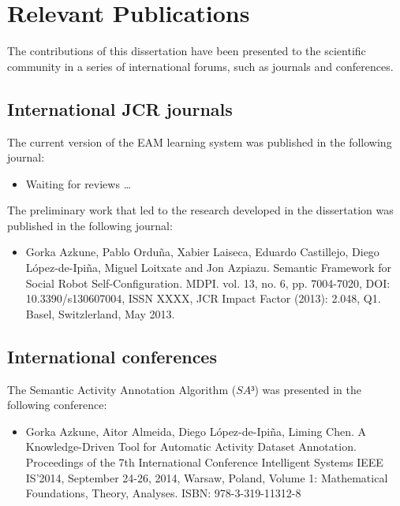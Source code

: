 \section{Relevant Publications}
\label{sec:conclusions:pub}

The contributions of this dissertation have been presented to the scientific community in a series of international forums, such as journals and conferences.

\subsection{International JCR journals}

The current version of the EAM learning system was published in the following journal:

\begin{itemize}
 \item Waiting for reviews \ldots
\end{itemize}

The preliminary work that led to the research developed in the dissertation was published in the following journal:

\begin{itemize}
 \item Gorka Azkune, Pablo Orduña, Xabier Laiseca, Eduardo Castillejo, Diego López-de-Ipiña, Miguel Loitxate and Jon Azpiazu. Semantic Framework for Social Robot Self-Configuration. MDPI. vol. 13, no. 6, pp. 7004-7020, DOI: 10.3390/s130607004, ISSN XXXX, JCR Impact Factor (2013): 2.048, Q1. Basel, Switzlerland, May 2013.
\end{itemize}

\subsection{International conferences}

The Semantic Activity Annotation Algorithm ($SA³$) was presented in the following conference:

\begin{itemize}
 \item Gorka Azkune, Aitor Almeida, Diego López-de-Ipiña, Liming Chen. A Knowledge-Driven Tool for Automatic Activity Dataset Annotation. Proceedings of the 7th International Conference Intelligent Systems IEEE IS’2014, September 24-26, 2014, Warsaw, Poland, Volume 1: Mathematical Foundations, Theory, Analyses. ISBN: 978-3-319-11312-8
\end{itemize}

